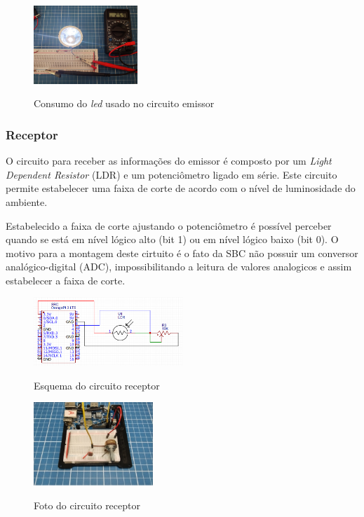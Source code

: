 \begin{figure}[!htbp]
  \caption{Consumo do \textit{led} usado no circuito emissor}
  \includegraphics[width=0.35\textwidth]{images/consumo_led.jpg}
  \label{corrente_led}
\end{figure}


\subsubsection{Receptor}

O circuito para receber as informações do emissor é composto por um \textit{Light Dependent Resistor} (LDR) e um potenciômetro ligado em série. Este circuito permite estabelecer uma faixa de corte de acordo com o nível de luminosidade do ambiente.

Estabelecido a faixa de corte ajustando o potenciômetro é possível perceber quando se está em nível lógico alto (bit 1) ou em nível lógico baixo (bit 0). O motivo para a montagem deste cirtuito é o fato da SBC não possuir um conversor analógico-digital (ADC), impossibilitando a leitura de valores analogicos e assim estabelecer a faixa de corte.


\begin{figure}[!htbp]
  \caption{Esquema do circuito receptor}
  \includegraphics[width=0.5\textwidth]{images/esquema_circuito_receptor.png}
  \label{esquema-circuito-receptor}
\end{figure}


\begin{figure}[!htbp]
  \caption{Foto do circuito receptor}
  \includegraphics[width=0.4\textwidth]{images/foto_circuito_receptor.jpg}
  \label{foto-circuito-receptor}
\end{figure}


